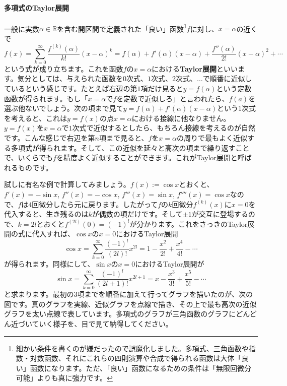 \paragraph{多項式のTaylor展開}

一般に実数$\alpha\in\mathbb{R}$を含む開区間で定義された「良い」函数\footnote{細かい条件を書くのが嫌だったので誤魔化しました。多項式、三角函数や指数・対数函数、それにこれらの四則演算や合成で得られる函数は大体「良い」函数になります。ただ、「良い」函数になるための条件は「無限回微分可能」よりも真に強力です。}$f$に対し、$x = \alpha$の近くで
\[
f(x) = \sum_{k = 0}^{\infty} \frac{f^{(k)}(\alpha)}{k!} (x - \alpha)^k = f(\alpha) + f'(\alpha)(x - \alpha) + \frac{f''(\alpha)}{2!}(x - \alpha)^2 + \cdots
\]
という式が成り立ちます。これを函数$f$の$x = \alpha$における\textbf{Taylor展開}といいます。気分としては、与えられた函数を$0$次式、$1$次式、$2$次式、$\ldots$で順番に近似しているという感じです。たとえば右辺の第$1$項だけ見ると$y = f(\alpha)$という定数函数が得られます。もし「$x = \alpha$で$f$を定数で近似しろ」と言われたら、$f(a)$を選ぶ他ないでしょう。次の項まで見て$y = f(\alpha) + f'(\alpha)(x - \alpha)$という$1$次式を考えると、これは$y = f(x)$の点$x = \alpha$における接線に他なりません。$y = f(x)$を$x = \alpha$で$1$次式で近似するとしたら、もちろん接線を考えるのが自然です。こんな感じで右辺を第$n$項まで見ると、$f$を$x = \alpha$の周りで最もよく近似する多項式が得られます。そして、この近似を延々と高次の項まで繰り返すことで、いくらでも$f$を精度よく近似することができます。これがTaylor展開と呼ばれるものです。

試しに有名な例で計算してみましょう。$f(x) := \cos x$とおくと、$f'(x) = -\sin x$, $f''(x) = -\cos x$, $f'''(x) = \sin x$, $f''''(x) = \cos x$なので、$f$は$4$回微分したら元に戻ります。したがって$f$の$k$回微分$f^{(k)}(x)$に$x = 0$を代入すると、生き残るのは$k$が偶数の項だけです。そして$\pm 1$が交互に登場するので、$k = 2l$とおくと$f^{(2l)}(0) = (-1)^l$が分かります。これをさっきのTaylor展開の式に代入すれば、$\cos x$の$x = 0$におけるTaylor展開
\[
\cos x = \sum_{k = 0}^{\infty}\frac{(-1)^l}{(2l)!} x^{2l} = 1 - \frac{x^2}{2!} + \frac{x^4}{4!} - \cdots
\]
が得られます。同様にして、$\sin x$の$x = 0$におけるTaylor展開が
\[
\sin x = \sum_{k = 0}^{\infty}\frac{(-1)^l}{(2l + 1)!} x^{2l + 1} = x - \frac{x^3}{3!} + \frac{x^5}{5!} - \cdots
\]
と求まります。最初の$3$項までを順番に加えて行ってグラフを描いたのが、次の図です。真のグラフを実線、近似グラフを点線で描き、その上で最も高次の近似グラフを太い点線で表しています。多項式のグラフが三角函数のグラフにどんどん近づいていく様子を、目で見て納得してください。
\begin{figure}[h!tbp]
\centering
{} \qquad
{}
\end{figure}

